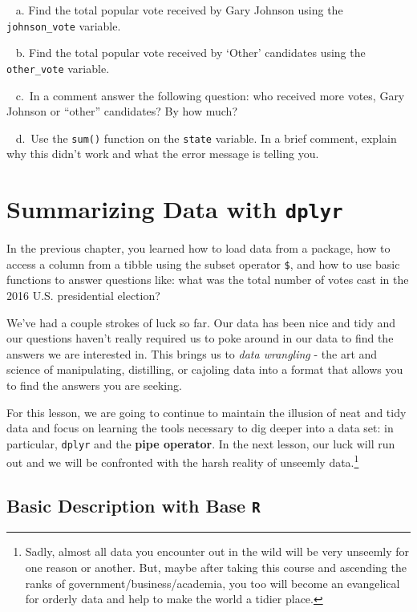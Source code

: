 \documentclass[
]{book}
\begin{document}
~ a. Find the total popular vote received by Gary Johnson using the \texttt{johnson\_vote} variable.

~ b. Find the total popular vote received by `Other' candidates using the \texttt{other\_vote} variable.

~ c.~In a comment answer the following question: who received more votes, Gary Johnson or ``other'' candidates? By how much?

~ d.~Use the \texttt{sum()} function on the \texttt{state} variable. In a brief comment, explain why this didn't work and what the error message is telling you.

\hypertarget{summarizing-data-with-dplyr}{%
\chapter{\texorpdfstring{Summarizing Data with \texttt{dplyr}}{Summarizing Data with dplyr}}\label{summarizing-data-with-dplyr}}

In the previous chapter, you learned how to load data from a package, how to access a column from a tibble using the subset operator \texttt{\$}, and how to use basic functions to answer questions like: what was the total number of votes cast in the 2016 U.S. presidential election?

We've had a couple strokes of luck so far. Our data has been nice and tidy and our questions haven't really required us to poke around in our data to find the answers we are interested in. This brings us to \emph{data wrangling} - the art and science of manipulating, distilling, or cajoling data into a format that allows you to find the answers you are seeking.

For this lesson, we are going to continue to maintain the illusion of neat and tidy data and focus on learning the tools necessary to dig deeper into a data set: in particular, \texttt{dplyr} and the \textbf{pipe operator}. In the next lesson, our luck will run out and we will be confronted with the harsh reality of unseemly data.\footnote{Sadly, almost all data you encounter out in the wild will be very unseemly for one reason or another. But, maybe after taking this course and ascending the ranks of government/business/academia, you too will become an evangelical for orderly data and help to make the world a tidier place.}

\hypertarget{basic-description-with-base-r}{%
\section{\texorpdfstring{Basic Description with Base \texttt{R}}{Basic Description with Base R}}\label{basic-description-with-base-r}}
\end{document}
